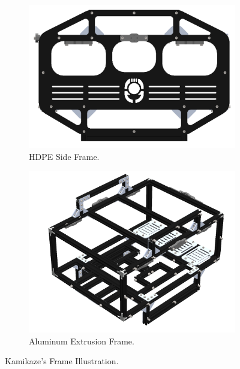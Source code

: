\begin{figure}[t]
    \centering
    \begin{subfigure}[b]{0.45\columnwidth}
        \includegraphics[width=\textwidth]{Sections/2Design Rationale/images/side frame.png}
        \caption{HDPE Side Frame.}
        \label{fig:side_frame}
    \end{subfigure}
    \hfill
    \begin{subfigure}[b]{0.5\columnwidth}
        \includegraphics[width=\textwidth]{Sections/2Design Rationale/images/frame.png}
        \caption{Aluminum Extrusion Frame.}
        \label{fig:frame}
    \end{subfigure}
    \caption{Kamikaze's Frame Illustration.}
    \label{fig:full_frame}
\end{figure}

